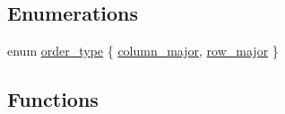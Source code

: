 \subsection*{Enumerations}
\begin{DoxyCompactItemize}
\item 
enum \hyperlink{namespaceglm_1_1io_a3497781803fe594a37177e05ab2a795f}{order\+\_\+type} \{ \hyperlink{namespaceglm_1_1io_a3497781803fe594a37177e05ab2a795faab661780f7f081ee11c34be9b0742229}{column\+\_\+major}, 
\hyperlink{namespaceglm_1_1io_a3497781803fe594a37177e05ab2a795fad080bb2f932ea4078fd0fc10ea1c991c}{row\+\_\+major}
 \}
\end{DoxyCompactItemize}
\subsection*{Functions}
